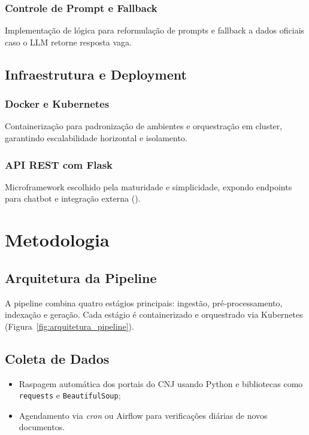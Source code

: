 \subsection{Controle de Prompt e Fallback}
Implementação de lógica para reformulação de prompts e fallback a dados oficiais caso o LLM retorne resposta vaga.

\section{Infraestrutura e Deployment}
\subsection{Docker e Kubernetes}
Containerização para padronização de ambientes e orquestração em cluster, garantindo escalabilidade horizontal e isolamento.

\subsection{API REST com Flask}
Microframework escolhido pela maturidade e simplicidade, expondo endpoints para chatbot e integração externa (\cite{flask2024}).


\chapter{Metodologia}
\label{chap:metodologia}

\section{Arquitetura da Pipeline}
A pipeline combina quatro estágios principais: ingestão, pré‐processamento, indexação e geração. Cada estágio é containerizado e orquestrado via Kubernetes (Figura~\ref{fig:arquitetura_pipeline}).

\section{Coleta de Dados}
\begin{itemize}[label=\textbullet]
  \item Raspagem automática dos portais do CNJ usando Python e bibliotecas como \texttt{requests} e \texttt{BeautifulSoup};
  \item Agendamento via \emph{cron} ou Airflow para verificações diárias de novos documentos.
\end{itemize}

